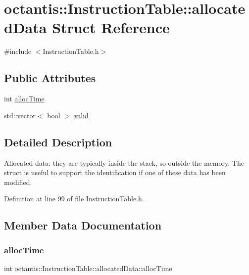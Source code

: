 \hypertarget{structoctantis_1_1InstructionTable_1_1allocatedData}{}\section{octantis\+:\+:Instruction\+Table\+:\+:allocated\+Data Struct Reference}
\label{structoctantis_1_1InstructionTable_1_1allocatedData}


{\ttfamily \#include $<$Instruction\+Table.\+h$>$}

\subsection*{Public Attributes}
\begin{DoxyCompactItemize}
\item 
int \hyperlink{structoctantis_1_1InstructionTable_1_1allocatedData_a93134066380dd21870cb0ae4e427e274}{alloc\+Time}
\item 
std\+::vector$<$ bool $>$ \hyperlink{structoctantis_1_1InstructionTable_1_1allocatedData_aa7c0311cec133ea705cb67da27b1b48a}{valid}
\end{DoxyCompactItemize}


\subsection{Detailed Description}
Allocated data\+: they are typically inside the stack, so outside the memory. The struct is useful to support the identification if one of these data has been modified. 

Definition at line 99 of file Instruction\+Table.\+h.



\subsection{Member Data Documentation}
\mbox{\label{structoctantis_1_1InstructionTable_1_1allocatedData_a93134066380dd21870cb0ae4e427e274}} 
\subsubsection{\texorpdfstring{alloc\+Time}{allocTime}}
{\footnotesize\ttfamily int octantis\+::\+Instruction\+Table\+::allocated\+Data\+::alloc\+Time}



